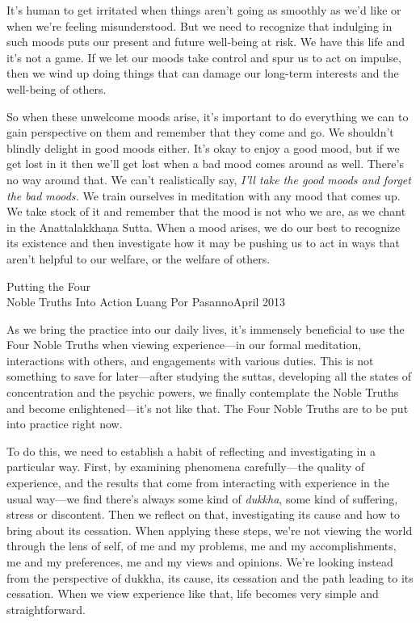 It's human to get irritated when things aren't going as smoothly as 
we'd like or when we're feeling misunderstood. But we need to recognize 
that indulging in such moods puts our present and future well-being at 
risk. We have this life and it's not a game. If we let our moods take 
control and spur us to act on impulse, then we wind up doing things 
that can damage our long-term interests and the well-being of others.

So when these unwelcome moods arise, it's important to do everything we 
can to gain perspective on them and remember that they come and go. We 
shouldn't blindly delight in good moods either. It's okay to enjoy a 
good mood, but if we get lost in it then we'll get lost when a bad mood 
comes around as well. There's no way around that. We can't 
realistically say, \emph{I'll take the good moods and forget the bad 
moods.} We train ourselves in meditation with any mood that comes up. 
We take stock of it and remember that the mood is not who we are, as we 
chant in the Anattalakkhaṇa Sutta. When a mood arises, we do our best 
to recognize its existence and then investigate how it may be pushing 
us to act in ways that aren't helpful to our welfare, or the welfare of 
others.

{Putting the Four\\Noble Truths Into Action}
{Luang Por Pasanno}{April 2013}

As we bring the practice into our daily lives, it's immensely 
beneficial to use the Four Noble Truths when viewing experience---in 
our formal meditation, interactions with others, and engagements with 
various duties. This is not something to save for later---after 
studying the suttas, developing all the states of concentration and the 
psychic powers, we finally contemplate the Noble Truths and become 
enlightened---it's not like that. The Four Noble Truths are to be put 
into practice right now.

To do this, we need to establish a habit of reflecting and 
investigating in a particular way. First, by examining phenomena 
carefully---the quality of experience, and the results that come from 
interacting with experience in the usual way---we find there's always 
some kind of \emph{dukkha}, some kind of suffering, stress or 
discontent. Then we reflect on that, investigating its cause and how to 
bring about its cessation. When applying these steps, we're not viewing 
the world through the lens of self, of me and my problems, me and my 
accomplishments, me and my preferences, me and my views and opinions. 
We're looking instead from the perspective of dukkha, its cause, its 
cessation and the path leading to its cessation. When we view 
experience like that, life becomes very simple and straightforward.

